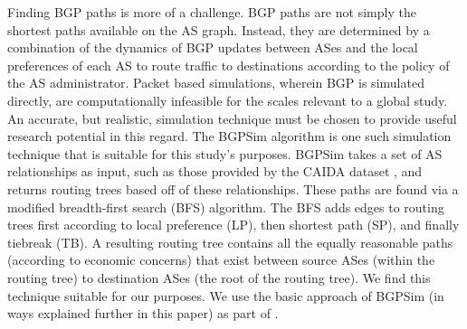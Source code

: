 \par Finding BGP paths is more of
a challenge. BGP paths are not simply the shortest paths available on the
AS graph. Instead, they are determined by a combination of the dynamics of
BGP updates between ASes and the local preferences of each AS to route traffic
to destinations according to the policy of the AS administrator. 
Packet based simulations, wherein BGP is simulated
directly, are computationally infeasible for the scales relevant to a
global study. An accurate, but realistic, simulation technique must be
chosen to provide useful research potential in this regard.  The
BGPSim algorithm \cite{quicksand} is one such simulation technique
that is suitable for this study's purposes. BGPSim takes a set of AS
relationships as input, such as those provided by the CAIDA dataset
\cite{CAIDA}, and returns routing trees based off of these
relationships. These paths are found via a modified breadth-first
search (BFS) algorithm. The BFS adds edges to routing trees first
according to local preference (LP), then shortest path (SP), and
finally tiebreak (TB).  A resulting routing tree contains all the
equally reasonable paths (according to economic concerns) that exist
between source ASes (within the routing tree) to destination ASes (the
root of the routing tree). We find this technique suitable  for our
purposes. We use the basic approach of BGPSim (in ways explained further in this
paper) as part of \toolname{}.

